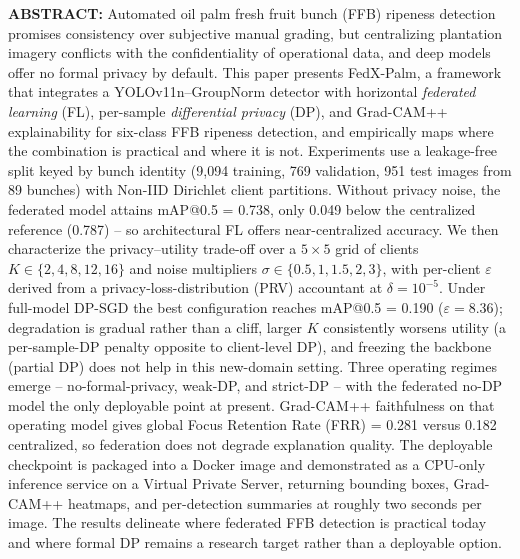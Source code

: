 \documentclass[twocolumn,a4paper,10pt]{article}
\begin{document}
\begin{@twocolumnfalse}
\noindent\textbf{ABSTRACT:} Automated oil palm fresh fruit bunch (FFB) ripeness
detection promises consistency over subjective manual grading, but centralizing
plantation imagery conflicts with the confidentiality of operational data, and
deep models offer no formal privacy by default. This paper presents FedX-Palm,
a framework that integrates a YOLOv11n--GroupNorm detector with horizontal
\emph{federated learning} (FL), per-sample \emph{differential privacy} (DP),
and Grad-CAM++ explainability for six-class FFB ripeness detection, and
empirically maps where the combination is practical and where it is not.
Experiments use a leakage-free split keyed by bunch identity (9,094 training,
769 validation, 951 test images from 89 bunches) with Non-IID Dirichlet client
partitions. Without privacy noise, the federated model attains mAP@0.5 = 0.738,
only 0.049 below the centralized reference (0.787) -- so architectural FL
offers near-centralized accuracy. We then characterize the privacy--utility
trade-off over a $5 \times 5$ grid of clients $K \in \{2,4,8,12,16\}$ and noise
multipliers $\sigma \in \{0.5,1,1.5,2,3\}$, with per-client $\varepsilon$
derived from a privacy-loss-distribution (PRV) accountant at $\delta =
10^{-5}$. Under full-model DP-SGD the best configuration reaches mAP@0.5 =
0.190 ($\varepsilon = 8.36$); degradation is gradual rather than a cliff,
larger $K$ consistently worsens utility (a per-sample-DP penalty opposite to
client-level DP), and freezing the backbone (partial DP) does not help in this
new-domain setting. Three operating regimes emerge -- no-formal-privacy,
weak-DP, and strict-DP -- with the federated no-DP model the only deployable
point at present. Grad-CAM++ faithfulness on that operating model gives global
Focus Retention Rate (FRR) = 0.281 versus 0.182 centralized, so federation
does not degrade explanation quality. The deployable checkpoint is packaged
into a Docker image and demonstrated as a CPU-only inference service on a
Virtual Private Server, returning bounding boxes, Grad-CAM++ heatmaps, and
per-detection summaries at roughly two seconds per image. The results
delineate where federated FFB detection is practical today and where formal DP
remains a research target rather than a deployable option.


\end{@twocolumnfalse}
\end{document}
